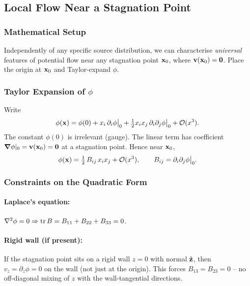 \documentclass[../main.tex]{subfiles}
\begin{document}
\subsection{Local Flow Near a Stagnation Point}\label{sec:lec15:stagnation_local}

\subsubsection*{Mathematical Setup}
Independently of any specific source distribution, we can characterise \emph{universal} features of potential flow near any stagnation point $\mathbf{x}_0$, where $\mathbf{v}(\mathbf{x}_0)=\mathbf{0}$. Place the origin at $\mathbf{x}_0$ and Taylor-expand $\phi$.

\subsubsection{Taylor Expansion of $\phi$}

Write
\begin{equation}
  \phi(\mathbf{x}) = \phi(0) + x_i\,\partial_i\phi\big|_0 + \tfrac{1}{2}x_i x_j\,\partial_i\partial_j\phi\big|_0 + \mathcal{O}(x^3).
  \label{eq:lec15_taylor}
\end{equation}
The constant $\phi(0)$ is irrelevant (gauge). The linear term has coefficient $\grad\phi|_0=\mathbf{v}(\mathbf{x}_0)=\mathbf{0}$ at a stagnation point. Hence near $\mathbf{x}_0$,
\begin{equation}
  \phi(\mathbf{x}) = \tfrac{1}{2}\,B_{ij}\,x_i x_j + \mathcal{O}(x^3),
  \qquad B_{ij}=\partial_i\partial_j\phi\big|_0.
  \label{eq:lec15_phi_quad}
\end{equation}

\subsubsection{Constraints on the Quadratic Form}

\paragraph{Laplace's equation:} $\nabla^2\phi=0\Rightarrow \mathrm{tr}\,B = B_{11}+B_{22}+B_{33}=0$.

\paragraph{Rigid wall (if present):} If the stagnation point sits on a rigid wall $z=0$ with normal $\hat{\mathbf{z}}$, then $v_z=\partial_z\phi=0$ on the wall (not just at the origin). This forces $B_{13}=B_{23}=0$ -- no off-diagonal mixing of $z$ with the wall-tangential directions.
\end{document}
